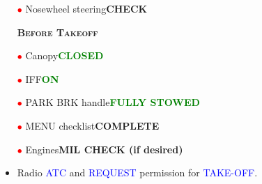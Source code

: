 \documentclass[a4paper,12pt,dvipsnames]{letter}
\newcommand{\radio}[1]{\textcolor{blue}{#1}}
\newcommand{\button}[1]{\textbf{#1}}
\newcommand{\ok}[1]{\textcolor{Green}{\textbf{#1}}}
\newcommand{\myHead}[1]{{\LARGE\textsc{\textbf{#1}}}}
\newcommand{\ri}{\textcolor{red}{$\bullet$\;}}
\begin{document}
{\begin{itemize}
 \item[\ri] Nosewheel steering\dotfill\button{CHECK}
\end{itemize}
\begin{itemize}
 \item[] \myHead{Before Takeoff}
 \item[\ri] Canopy\dotfill\ok{CLOSED}
 \item[\ri] IFF\dotfill\ok{ON}
 \item[\ri] PARK BRK handle\dotfill\ok{FULLY STOWED}
 \item[\ri] MENU checklist\dotfill\button{COMPLETE}
 \item[\ri] Engines\dotfill\button{MIL CHECK (if desired)}
  \item Radio \radio{ATC} and \radio{REQUEST} permission for \radio{TAKE-OFF}.
\end{itemize} 
%
}
\end{document}
